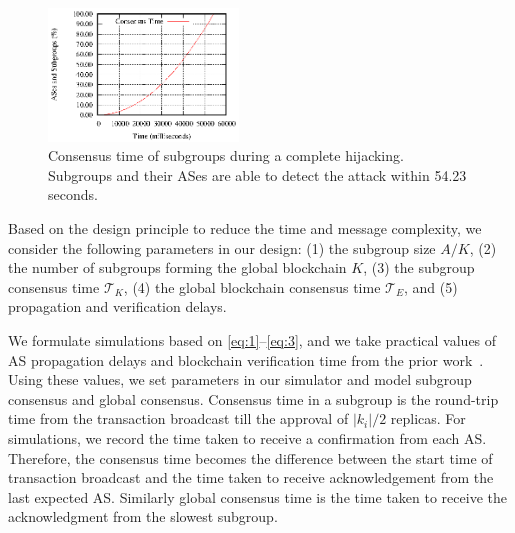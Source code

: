 \documentclass[conference]{IEEEtran}
\begin{document}
\begin{figure}[t]
\begin{center}
\includegraphics[width=0.45\textwidth]{fig/completeHijackR2.eps}
\caption{Consensus time of subgroups during a complete hijacking. Subgroups and their ASes are able to detect the attack within 54.23 seconds.} 
\label{fig:simComplete}
\end{center}
\end{figure}



Based on the design principle to reduce the time and message complexity, we consider the following parameters in our design: (1) the subgroup size $A/K$, (2) the number of subgroups forming the global blockchain $K$, (3) the subgroup consensus time $\mathcal{T}_{K}$, (4) the global blockchain consensus time $\mathcal{T}_{E}$, and (5) propagation and verification delays. 




We formulate simulations based on \autoref{eq:1}--\autoref{eq:3}, and we take practical values of AS propagation delays and blockchain verification time from the prior work~\cite{LabovitzABJ01,TakahashiEII15,pazmino2015}. Using these values, we set parameters in our simulator and model subgroup consensus and global consensus. Consensus time in a subgroup is the round-trip time from the transaction broadcast till the approval of $|k_{i}|/2$ replicas. For simulations, we record the time taken to receive a confirmation from each AS. Therefore, the consensus time becomes the difference between the start time of transaction broadcast and the time taken to receive acknowledgement from the last expected AS. Similarly global consensus time is the time taken to receive the acknowledgment from the slowest subgroup. 

\end{document}
